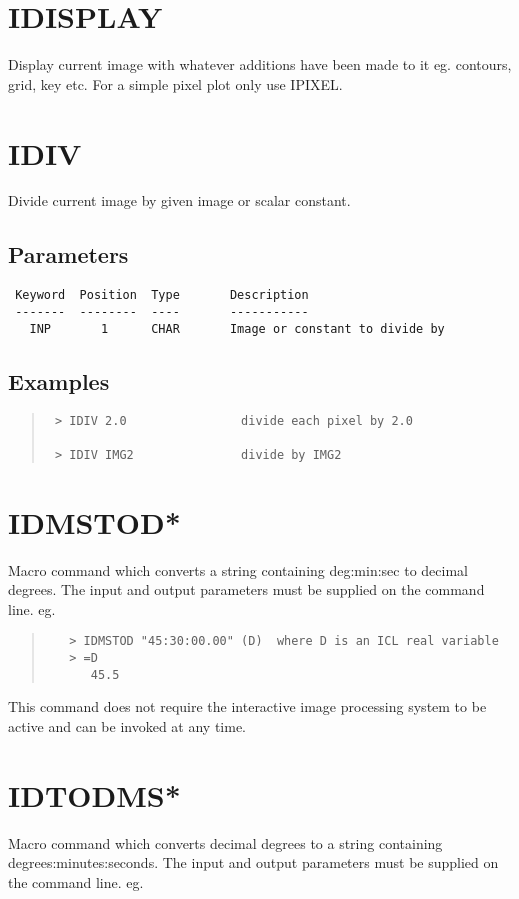 \documentclass{book}
\renewcommand{\_}{{\tt\char'137}}     %
\begin{document}
\section{IDISPLAY}
Display current image with whatever additions have been made to
it eg. contours, grid, key etc. For a simple pixel plot only use
IPIXEL.

\section{IDIV}
Divide current image by given image or scalar constant.

\subsection{Parameters}
\begin{verbatim}
 Keyword  Position  Type       Description
 -------  --------  ----       -----------
   INP       1      CHAR       Image or constant to divide by

\end{verbatim}\subsection{Examples}
\begin{quote}\begin{verbatim}
 > IDIV 2.0                divide each pixel by 2.0

 > IDIV IMG2               divide by IMG2
\end{verbatim}\end{quote}
\section{IDMSTOD*}
Macro command which converts a string containing deg:min:sec to
decimal degrees. The input and output parameters must be supplied
on the command line. eg.

\begin{quote}\begin{verbatim}
   > IDMSTOD "45:30:00.00" (D)  where D is an ICL real variable
   > =D
      45.5
 \end{verbatim}\end{quote}
This command does not require the interactive image processing
system to be active and can be invoked at any time.

\section{IDTODMS*}
Macro command which converts decimal degrees to a string containing
degrees:minutes:seconds. The input and output parameters must be
supplied on the command line. eg.
\end{document}
